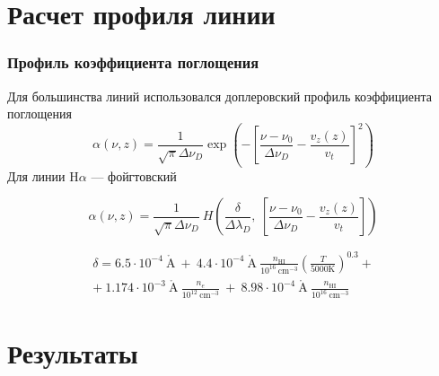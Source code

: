 \documentclass{beamer}
\begin{document}
\section{Расчет профиля линии}

\begin{frame}
\frametitle{Профиль коэффициента поглощения}
Для большинства линий использовался доплеровский профиль коэффициента поглощения
\begin{equation} \label{eq:profabsprof}
\alpha(\nu, z) = \frac{1}{\sqrt{\pi} \Delta\nu_D} \exp\left( -\left[ \frac{\nu - \nu_0}{\Delta\nu_D} - \frac{v_z(z)}{v_t}\right]^2\right)
\end{equation}
Для линии H$\alpha$ --- фойгтовский

\begin{equation} \label{eq:profabsfoigt}
\alpha(\nu, z) = \frac{1}{\sqrt{\pi} \Delta\nu_D}\ H\left(\frac{\delta}{\Delta\lambda_D},\ \left[ \frac{\nu - \nu_0}{\Delta\nu_D} - \frac{v_z(z)}{v_t}\right]\right)
\end{equation}

\small
\begin{align} \label{eq:foigtcoef}
\delta = 6.5\cdot 10^{-4} \ \mathring{\text{A}}\ +\ 4.4\cdot 10^{-4}\ \mathring{\text{A}} \ \frac{n_{\text{HI}}}{10^{16}\ \text{cm}^{-3}}\left(\frac{T}{5000 \text{K}}\right)^{0.3} + \nonumber \\ 
  +\ 1.174\cdot 10^{-3}\ \mathring{\text{A}}\ \frac{n_e}{10^{12}\ \text{cm}^{-3}}\ + \ 8.98\cdot 10^{-4}\ \mathring{\text{A}}\ \frac{n_\text{HI}}{10^{16}\ \text{cm}^{-3}} 
\end{align}
\normalsize
\end{frame}


\section{Результаты}
\end{document}
